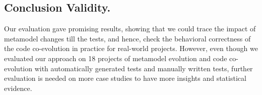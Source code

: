\subsection{Conclusion Validity.}
Our evaluation gave promising results, showing that we could trace the impact of metamodel changes till the tests, and hence, check the behavioral correctness of the code co-evolution in practice for real-world projects. 
However, even though we evaluated our approach on 18 projects of metamodel evolution and code co-evolution with automatically generated tests and manually written tests, further evaluation is needed on more case studies to have more insights and statistical evidence.  
